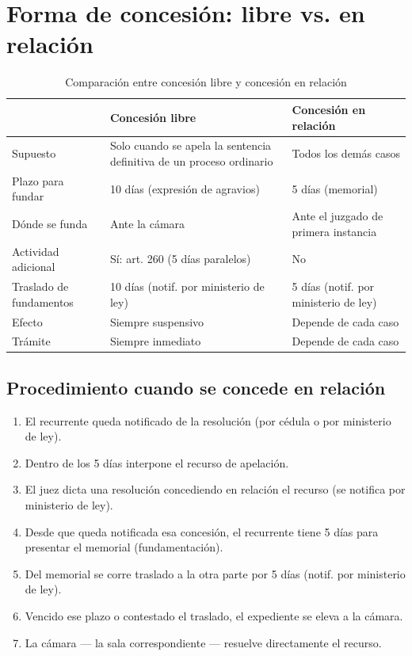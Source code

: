 \documentclass[12pt,oneside]{book}
\begin{document}
\section{Forma de concesión: libre vs. en relación}

\begin{table}[H]
\centering
\caption{Comparación entre concesión libre y concesión en relación}
\begin{tabularx}{\textwidth}{l X X}
\toprule
 & \textbf{Concesión libre} & \textbf{Concesión en relación} \\
\midrule
Supuesto & Solo cuando se apela la sentencia definitiva de un proceso ordinario & Todos los demás casos \\
Plazo para fundar & 10 días (expresión de agravios) & 5 días (memorial) \\
Dónde se funda & Ante la cámara & Ante el juzgado de primera instancia \\
Actividad adicional & Sí: art. 260 (5 días paralelos) & No \\
Traslado de fundamentos & 10 días (notif. por ministerio de ley) & 5 días (notif. por ministerio de ley) \\
Efecto & Siempre suspensivo & Depende de cada caso \\
Trámite & Siempre inmediato & Depende de cada caso \\
\bottomrule
\end{tabularx}
\end{table}

\subsection{Procedimiento cuando se concede en relación}

\begin{enumerate}
\item El recurrente queda notificado de la resolución (por cédula o por ministerio de ley).
\item Dentro de los 5 días interpone el recurso de apelación.
\item El juez dicta una resolución concediendo en relación el recurso (se notifica por ministerio de ley).
\item Desde que queda notificada esa concesión, el recurrente tiene 5 días para presentar el memorial (fundamentación).
\item Del memorial se corre traslado a la otra parte por 5 días (notif. por ministerio de ley).
\item Vencido ese plazo o contestado el traslado, el expediente se eleva a la cámara.
\item La cámara --- la sala correspondiente --- resuelve directamente el recurso.
\end{enumerate}
\end{document}
